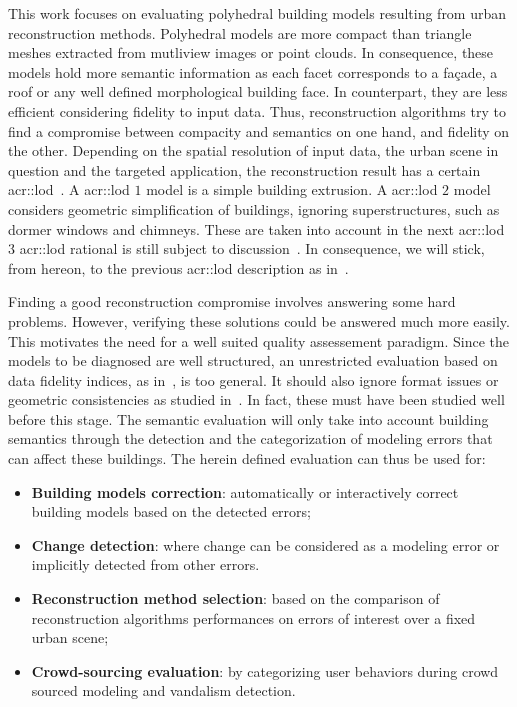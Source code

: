 \documentclass[runningheads]{llncs}
\begin{document}
    This work focuses on evaluating polyhedral building models resulting from urban reconstruction methods. Polyhedral models are more compact than triangle meshes extracted from mutliview images or point clouds. In consequence, these models hold more semantic information as each facet corresponds to a fa\c{c}ade, a roof or any well defined morphological building face. In counterpart, they are less efficient considering fidelity to input data. Thus, reconstruction algorithms try to find a compromise between compacity and semantics on one hand, and fidelity on the other. Depending on the spatial resolution of input data, the urban scene in question and the targeted application, the reconstruction result has a certain \gls{acr::lod}~\cite{kolbe2005citygml}. A \acrshort{acr::lod} $1$ model is a simple building extrusion. A \acrshort{acr::lod} $2$ model considers geometric simplification of buildings, ignoring superstructures, such as dormer windows and chimneys. These are taken into account in the next \acrshort{acr::lod} $3$ \acrshort{acr::lod} rational is still subject to discussion~\cite{2016_ceus_improved_lod}. In consequence, we will stick, from hereon, to the previous \acrshort{acr::lod} description as in~\cite{verdie2015lod}.

     Finding a good reconstruction compromise involves answering some hard problems. However, verifying these solutions could be answered much more easily. This motivates the need for a well suited quality assessement paradigm. Since the models to be diagnosed are well structured, an unrestricted evaluation based on data fidelity indices, as in~\cite{berger2013benchmark}, is too general. It should also ignore format issues or geometric consistencies as studied in~\cite{ledoux2018val3dity}. In fact, these must have been studied well before this stage. The semantic evaluation will only take into account building semantics through the detection and the categorization of modeling errors that can affect these buildings. The herein defined evaluation can thus be used for:
    \begin{itemize}
        \item \textbf{Building models correction}: automatically or interactively correct building models based on the detected errors;
        \item \textbf{Change detection}: where change can be considered as a modeling error or implicitly detected from other errors.
        \item \textbf{Reconstruction method selection}: based on the comparison of reconstruction algorithms performances on errors of interest over a fixed urban scene;
        \item \textbf{Crowd-sourcing evaluation}: by categorizing user behaviors during crowd sourced modeling and vandalism detection.
    \end{itemize}
\end{document}
